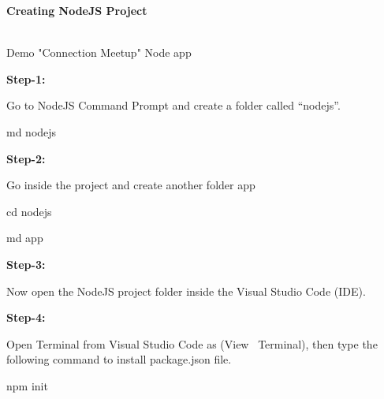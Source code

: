 \documentclass[
]{article}
\author{}
\date{}
\begin{document}
{\textbf{Creating NodeJS Project}}

{\textbf{}}\strut \\

Demo "Connection Meetup" Node app

\hfill    

\textbf{Step-1:}

Go to NodeJS Command Prompt and create a folder called ``nodejs''.

md nodejs

\hfill    

\textbf{Step-2:}

Go inside the project and create another folder app

cd nodejs

md app

\hfill    

\textbf{Step-3:}

Now open the NodeJS project folder inside the Visual Studio Code (IDE).

\hfill    

\textbf{Step-4:}

Open Terminal from Visual Studio Code as (View{~ }Terminal), then type
the following command to install package.json file.

\hfill    

npm init
\end{document}
